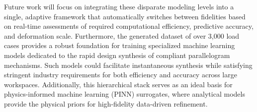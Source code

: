 \documentclass[colorlinks,upint,subscriptcorrection,varvw,hyphenate,balance]{asmeconf} %
\begin{document}
Future work will focus on integrating these disparate modeling levels into a single, adaptive framework that automatically switches between fidelities based on real-time assessments of required computational efficiency, predictive accuracy, and deformation scale. Furthermore, the generated dataset of over 3,000 load cases provides a robust foundation for training specialized machine learning models dedicated to the rapid design synthesis of compliant parallelogram mechanisms. Such models could facilitate instantaneous synthesis while satisfying stringent industry requirements for both efficiency and accuracy across large workspaces. Additionally, this hierarchical stack serves as an ideal basis for physics-informed machine learning (PINN) surrogates, where analytical models provide the physical priors for high-fidelity data-driven refinement.










\end{document}
